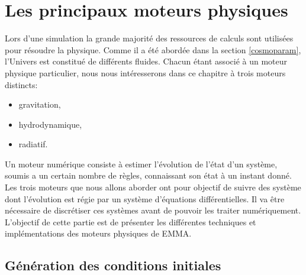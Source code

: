 \chapter{Les principaux moteurs physiques}
\label{sec:solvers}


Lors d'une simulation la grande majorité des ressources de calculs sont utilisées pour résoudre la physique.
Comme il a été abordée dans la section \ref{cosmoparam}, l'Univers est constitué de différents fluides.
Chacun étant associé à un moteur physique particulier, nous nous intéresserons dans ce chapitre à trois moteurs distincts:
\begin{itemize}
\item gravitation,
\item hydrodynamique,
\item radiatif.
\end{itemize}



Un moteur numérique consiste à estimer l'évolution de l'état d'un système, soumis a un certain nombre de règles, connaissant son état à un instant donné.
Les trois moteurs que nous allons aborder ont pour objectif de suivre des système dont l'évolution est régie par un système d'équations différentielles.
Il va être nécessaire de discrétiser ces systèmes avant de pouvoir les traiter numériquement.
L'objectif de cette partie est de présenter les différentes techniques et implémentations des moteurs physiques de EMMA.


\section{Génération des conditions initiales}
\label{sec:IC}

